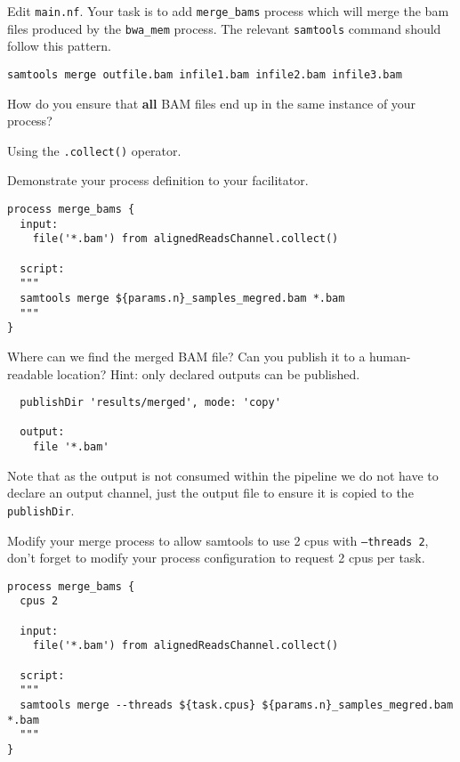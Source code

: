 \begin{bonus}

Edit \texttt{main.nf}. Your task is to add \texttt{merge\_bams} process which will merge the bam files produced by the \texttt{bwa\_mem} process. 
The relevant \texttt{samtools} command should follow this pattern.

\begin{lstlisting}
samtools merge outfile.bam infile1.bam infile2.bam infile3.bam 
\end{lstlisting}


\begin{questions}
How do you ensure that \textbf{all} BAM files end up in the same instance of your process?
\begin{answer}
Using the \texttt{.collect()} operator.
\end{answer}
Demonstrate your process definition to your facilitator.

\begin{answer}
\begin{lstlisting}
process merge_bams {
  input:
    file('*.bam') from alignedReadsChannel.collect()

  script:
  """
  samtools merge ${params.n}_samples_megred.bam *.bam
  """
}
\end{lstlisting}
\end{answer}
Where can we find the merged BAM file? Can you publish it to a human-readable location? Hint: only declared outputs can be published.
\begin{answer}
\begin{lstlisting}
  publishDir 'results/merged', mode: 'copy'

  output:
    file '*.bam'
\end{lstlisting}

Note that as the output is not consumed within the pipeline we do not have to declare an output channel, just the output file to ensure it is copied to the \texttt{publishDir}.
\end{answer}

Modify your merge process to allow samtools to use 2 cpus with \texttt{--threads 2},
don't forget to modify your process configuration to request 2 cpus per task.
\end{questions}
\begin{answer}
\begin{lstlisting}
process merge_bams {
  cpus 2

  input:
    file('*.bam') from alignedReadsChannel.collect()

  script:
  """
  samtools merge --threads ${task.cpus} ${params.n}_samples_megred.bam *.bam
  """
}
\end{lstlisting}
\end{answer}
\end{bonus}


